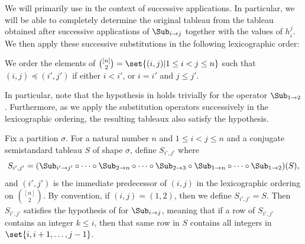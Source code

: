 \documentclass[letterpaper, 11pt]{amsart}
\begin{document}
We will primarily use  in the context of successive applications.
In particular, we will be able to completely determine the original tableau from the tableau obtained after successive applications of $\Sub_{i \to j}$ together with the values of $h_i^j$.
We then apply these successive substitutions in the following lexicographic order:
\begin{defn}\label{defn:ordering}
    We order the elements of $\binom{[n]}{2}=\set{(i, j) | 1 \leq i < j \leq n}$ such that $(i,j) \preceq (i',j')$ if either $i < i'$, or $i = i'$ and $j \leq j'$.
\end{defn}
In particular, note that the hypothesis in  holds trivially for the operator $\Sub_{1 \to 2}$.
Furthermore, as we apply the substitution operators successively in the lexicographic ordering, the resulting tableaux also satisfy the hypothesis.

\begin{lem}\label{lem:sub_successive_hyp}
    Fix a partition $\sigma$.
    For a natural number $n$ and $1 \leq i < j \leq n$ and a conjugate semistandard tableau $S$ of shape $\sigma$, define $S_{i', j'}$ where
    \[
        S_{i', j'} = (\Sub_{i' \to j'} \circ \cdots \circ \Sub_{2 \to n}\circ\cdots\circ\Sub_{2 \to 3} \circ \Sub_{1 \to n} \circ \cdots \circ \Sub_{1 \to 2})(S),
    \]
    and $(i', j')$ is the immediate predecessor of $(i, j)$ in the lexicographic ordering on $\binom{[n]}{2}$.
    By convention, if $(i, j) = (1, 2)$, then we  define $S_{i', j'} = S$.
    Then $S_{i', j'}$ satisfies the hypothesis of  for $\Sub_{i \to j}$, meaning that if a row of $S_{i', j'}$ contains an integer $k \leq i$, then that same row in $S$ contains all integers in $\set{i, i + 1, \ldots, j - 1}$.
\end{lem}
\end{document}
